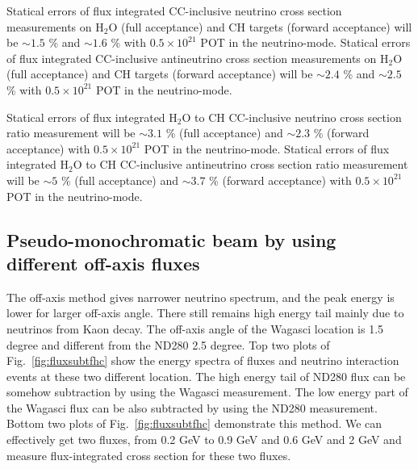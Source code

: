 Statical errors of flux integrated CC-inclusive neutrino cross section measurements on H$_{2}$O (full acceptance) and CH targets (forward acceptance)
will be $\sim 1.5$ \% and $\sim 1.6$ \% with $0.5\times 10^{21}$ POT in the neutrino-mode.
Statical errors of flux integrated CC-inclusive antineutrino cross section measurements on H$_{2}$O (full acceptance) and CH targets (forward acceptance)
will be $\sim 2.4$ \% and $\sim 2.5$ \% with $0.5\times 10^{21}$ POT in the neutrino-mode.


Statical errors of flux integrated H$_{2}$O to CH CC-inclusive neutrino cross section ratio measurement 
will be $\sim 3.1$ \% (full acceptance) and $\sim 2.3$ \% (forward acceptance) with $0.5\times 10^{21}$ POT in the neutrino-mode.
Statical errors of flux integrated H$_{2}$O to CH CC-inclusive antineutrino cross section ratio measurement will be $\sim 5$ \% (full acceptance) and $\sim 3.7$ \% (forward acceptance) with $0.5\times 10^{21}$ POT in the neutrino-mode.


\subsection{Pseudo-monochromatic beam by using different off-axis fluxes}
The off-axis method gives narrower neutrino spectrum, and the peak energy is lower for larger off-axis angle.
There still remains high energy tail mainly due to neutrinos from Kaon decay.
The off-axis angle of the Wagasci location is 1.5 degree and different from the ND280 2.5 degree.
Top two plots of Fig.~\ref{fig:fluxsubtfhc} show the energy spectra of fluxes and neutrino interaction events
at these two different location.
The high energy tail of ND280 flux can be somehow subtraction by using the Wagasci measurement.
The low energy part of the Wagasci flux can be also subtracted by using the ND280 measurement.
Bottom two plots of Fig.~\ref{fig:fluxsubtfhc} demonstrate this method.
We can effectively get two fluxes, from 0.2 GeV to 0.9 GeV and 0.6 GeV and 2 GeV
and measure flux-integrated cross section for these two fluxes.


